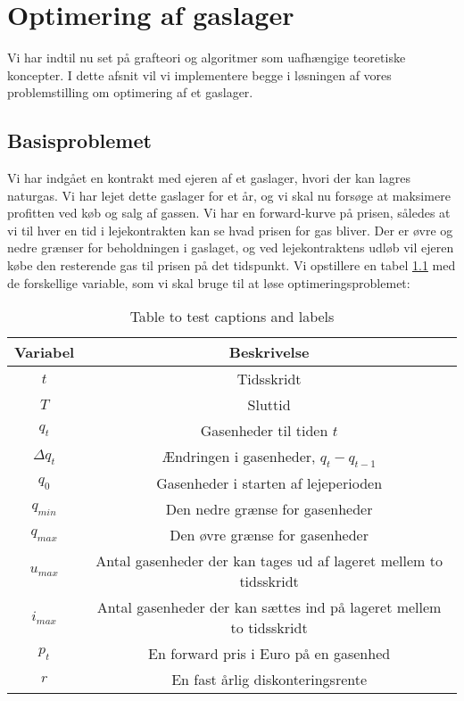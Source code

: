 \chapter{Optimering af gaslager}
Vi har indtil nu set på grafteori og algoritmer som  uafhængige teoretiske koncepter. I dette afsnit vil vi implementere begge i løsningen af vores problemstilling om optimering af et gaslager.

\section{Basisproblemet}
Vi har indgået en kontrakt med ejeren af et gaslager, hvori der kan lagres naturgas. Vi har lejet dette gaslager for et år, og vi skal nu forsøge at maksimere profitten ved køb og salg af gassen. Vi har en forward-kurve på prisen, således at vi til hver en tid i lejekontrakten kan se hvad prisen for gas bliver. Der er øvre og nedre grænser for beholdningen i gaslaget, og ved lejekontraktens udløb vil ejeren købe den resterende gas til prisen på det tidspunkt. Vi opstillere en tabel \ref{table:1} med de forskellige variable, som vi skal bruge til at løse optimeringsproblemet:

\begin{table}[h!]
\centering
\begin{tabular}{||c | c||} 
 \hline
 Variabel & Beskrivelse \\ [0.5ex] 
 \hline\hline
 $t$ & Tidsskridt  \\ 
 $T$ & Sluttid  \\
 $q_{t}$ & Gasenheder til tiden $t$  \\
 $\Delta q_{t}$ & Ændringen i gasenheder,    $q_{t}-q_{t-1}$ \\
 $q_{0}$ & Gasenheder i starten af lejeperioden  \\
 $q_{min}$ & Den nedre grænse for gasenheder \\ 
 $q_{max}$ & Den øvre grænse for gasenheder \\
 $u_{max}$ & Antal gasenheder der kan tages ud af lageret mellem to tidsskridt \\ 
 $i_{max}$ & Antal gasenheder der kan sættes ind på lageret mellem to tidsskridt \\ 
 $p_{t}$ & En forward pris i Euro på en gasenhed  \\
 $r$ & En fast årlig diskonteringsrente  \\
 [1ex] 
 \hline
\end{tabular}
\caption{Table to test captions and labels}
\label{table:1}
\end{table}

